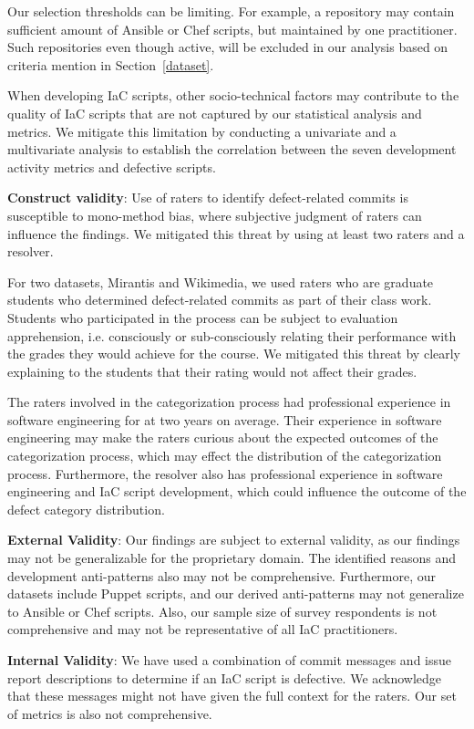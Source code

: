 \documentclass[smallextended]{svjour3}       %
\begin{document}
Our selection thresholds can be limiting. For example, a repository may contain sufficient amount of Ansible or Chef scripts, but maintained by one practitioner. Such repositories even though active, will be excluded in our analysis based on criteria mention in Section~\ref{dataset}. 

When developing IaC scripts, other socio-technical factors may contribute to the quality of IaC scripts that are not captured by our statistical analysis and metrics. We mitigate this limitation by conducting a univariate and a multivariate analysis to establish the correlation between the seven development activity metrics and defective scripts. 

\textbf{Construct validity}: Use of raters to identify defect-related commits is susceptible to mono-method bias, where subjective judgment of raters can influence the findings. We mitigated this threat by using at least two raters and a resolver.  

For two datasets, Mirantis and Wikimedia, we used raters who are graduate students who determined defect-related commits as part of their class work. Students who participated in the process can be subject to evaluation apprehension, i.e. consciously or sub-consciously relating their performance with the grades they would achieve for the course. We mitigated this threat by clearly explaining to the students that their rating would not affect their grades. 

The raters involved in the categorization process had professional experience in software engineering for at two years on average. Their experience in software engineering may make the raters curious about the expected outcomes of the categorization process, which may effect the distribution of the categorization process. Furthermore, the resolver also has professional experience in software engineering and IaC script development, which could influence the outcome of the defect category distribution. 


\textbf{External Validity}: Our findings are subject to external validity, as our findings may not be generalizable for the proprietary domain. The identified reasons and development anti-patterns also may not be comprehensive. Furthermore, our datasets include Puppet scripts, and our derived anti-patterns may not generalize to Ansible or Chef scripts. Also, our sample size of survey respondents is not comprehensive and may not be representative of all IaC practitioners. 

\textbf{Internal Validity}: We have used a combination of commit messages and issue report descriptions to determine if an IaC script is defective. We acknowledge that these messages might not have given the full context for the raters. Our set of metrics is also not comprehensive.    
\end{document}
